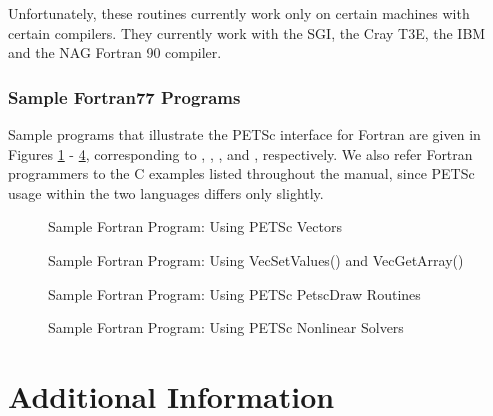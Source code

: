 Unfortunately, these routines currently work only on certain machines with 
certain compilers. They currently work with the SGI, the Cray T3E, the
IBM and the NAG Fortran 90 compiler.

\section{Sample Fortran77 Programs}
\label{sec:fortran-examples}

Sample programs that illustrate the PETSc interface for Fortran
are given in Figures \ref{fig:vec-Fortran} - \ref{fig:SNES-Fortran},
corresponding to
, 
, 
\break {}, and 
, respectively.  We also
refer Fortran programmers to the C examples listed throughout the manual,
since PETSc usage within the two languages differs only slightly.

\begin{figure}[H]
{\small
{}
}
\caption{Sample Fortran Program:  Using PETSc Vectors}
\label{fig:vec-Fortran}
\end{figure}

\begin{figure}[H]
{\small
{}
}
\caption{Sample Fortran Program:  Using VecSetValues() and VecGetArray()}
\label{fig:vec2-Fortran}
\end{figure}

\begin{figure}[H]
{\small
{}
}
\caption{Sample Fortran Program:  Using PETSc PetscDraw Routines}
\label{fig:draw-Fortran}
\end{figure}

\begin{figure}[H]
{\small
{}
}
\caption{Sample Fortran Program:  Using PETSc Nonlinear Solvers}
\label{fig:SNES-Fortran}
\end{figure}

\part{Additional Information}
\label{part:usefulstuff}

